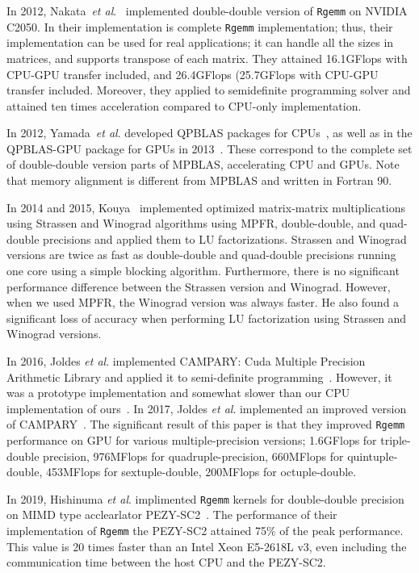 \documentclass[12pt]{article}
\newcommand{\etal}{\textit{et al}.}
\begin{document}
In 2012, Nakata~\etal{}~\cite{6495966} implemented double-double version of {\tt Rgemm} on NVIDIA C2050. In their implementation is complete {\tt Rgemm} implementation; thus, their implementation can be used for real applications; it can handle all the sizes in matrices, and supports transpose of each matrix. They attained 16.1GFlops with CPU-GPU transfer included, and 26.4GFlops (25.7GFlops with CPU-GPU transfer included. Moreover, they applied to semidefinite programming solver and attained ten times acceleration compared to CPU-only implementation.

In 2012, Yamada~\etal{} developed QPBLAS packages for CPUs~\cite{7965202}, as well as in the QPBLAS-GPU package for GPUs in 2013~\cite{qpblas-gpu}. These correspond to the complete set of double-double version parts of MPBLAS, accelerating CPU and GPUs. Note that memory alignment is different from MPBLAS and written in Fortran 90.

In 2014 and 2015, Kouya~\cite{Tomonori_Kouya2014,Tomonori_Kouya2016} implemented optimized  matrix-matrix multiplications using Strassen and Winograd algorithms using MPFR, double-double, and quad-double precisions and applied them to LU factorizations. Strassen and Winograd versions are twice as fast as double-double and quad-double precisions running one core using a simple blocking algorithm. Furthermore, there is no significant performance difference between the Strassen version and Winograd. However, when we used MPFR, the Winograd version was always faster. He also found a significant loss of accuracy when performing LU factorization using Strassen and Winograd versions. 

In 2016, Joldes \etal{} implemented CAMPARY: Cuda Multiple Precision Arithmetic Library and applied it to semi-definite programming~\cite{10.1007/978-3-319-42432-3_29}. However, it was a prototype implementation and somewhat slower than our CPU implementation of ours~\cite{SDPA-GMP}. In 2017, Joldes \etal{} implemented an improved version of CAMPARY~\cite{8023060}. The significant result of this paper is that they improved {\tt Rgemm} performance on GPU for various multiple-precision versions; 1.6GFlops for triple-double precision, 976MFlops for quadruple-precision, 660MFlops for quintuple-double, 453MFlops for sextuple-double, 200MFlops for octuple-double.

In 2019, Hishinuma \etal{} implimented {\tt Rgemm} kernels for double-double precision on MIMD type acclearlator PEZY-SC2~\cite{hishinuma2019pzqd}. 
The performance of their implementation of {\tt Rgemm} the PEZY-SC2 attained 75\% of the peak performance. This value is 20 times faster than an Intel Xeon E5-2618L v3, even including the communication time between the host CPU and the PEZY-SC2.
\end{document}
